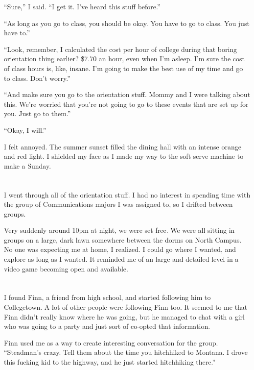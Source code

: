 ``Sure,'' I said.  ``I get it.  I've heard this stuff before.''

``As long as you go to class, you should be okay.  You have to go to class.  You
just have to.''

``Look, remember, I calculated the cost per hour of college during that boring
orientation thing earlier?  \$7.70 an hour, even when I'm asleep.  I'm sure the
cost of class hours is, like, insane.  I'm going to make the best use of my time
and go to class. Don't worry.''

``And make sure you go to the orientation stuff.  Mommy and I were talking about
this.  We're worried that you're not going to go to these events that are set up
for you.  Just go to them.''

``Okay, I will.''

I felt annoyed.  The summer sunset filled the dining hall with an intense orange
and red light.  I shielded my face as I made my way to the soft serve machine to
make a Sunday.

\section{}

I went through all of the orientation stuff.  I had no interest in spending
time with the group of Communications majors I was assigned to, so I drifted
between groups. 

Very suddenly around 10pm at night, we were set free.  We were all sitting in
groups on a large, dark lawn somewhere between the dorms on North Campus.  No
one was expecting me at home, I realized.  I could go where I wanted, and
explore as long as I wanted.  It reminded me of an large and detailed level in a
video game becoming open and available.

\section{}

I found Finn, a friend from high school, and started following him to
Collegetown.  A lot of other people were following Finn too.  It seemed to me
that Finn didn't really know where he was going, but he managed to chat with a
girl who was going to a party and just sort of co-opted that information.  

Finn used me as a way to create interesting conversation for the group.
``Steadman's crazy.  Tell them about the time you hitchhiked to Montana.  I
drove this fucking kid to the highway, and he just started hitchhiking there.''

